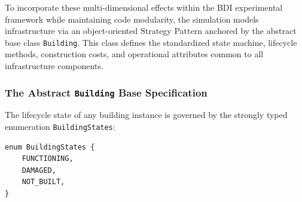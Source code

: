 To incorporate these multi-dimensional effects within the BDI experimental framework while maintaining code modularity, the simulation models infrastructure via an object-oriented Strategy Pattern anchored by the abstract base class \texttt{Building}. This class defines the standardized state machine, lifecycle methods, construction costs, and operational attributes common to all infrastructure components.

\subsubsection{The Abstract \texttt{Building} Base Specification}
The lifecycle state of any building instance is governed by the strongly typed enumeration \texttt{BuildingStates}:

\begin{lstlisting}[language=python, caption={Building state enumeration in GDScript.}, label={lst:building_states_enum}]
enum BuildingStates {
    FUNCTIONING,
    DAMAGED,
    NOT_BUILT,
}
\end{lstlisting}

